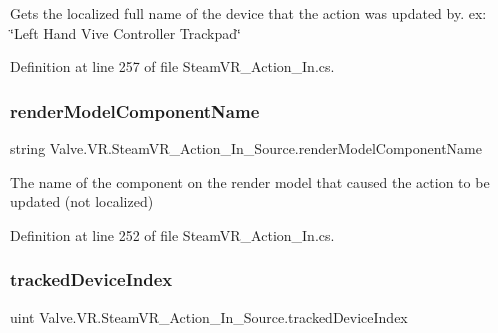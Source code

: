 Gets the localized full name of the device that the action was updated by. ex\+: \char`\"{}\+Left Hand Vive Controller Trackpad\char`\"{} 



Definition at line 257 of file Steam\+V\+R\+\_\+\+Action\+\_\+\+In.\+cs.

\mbox{\label{class_valve_1_1_v_r_1_1_steam_v_r___action___in___source_af15b7b53084c8385e25203b4d8ccc986}} 
\subsubsection{\texorpdfstring{renderModelComponentName}{renderModelComponentName}}
{\footnotesize\ttfamily string Valve.\+V\+R.\+Steam\+V\+R\+\_\+\+Action\+\_\+\+In\+\_\+\+Source.\+render\+Model\+Component\+Name\hspace{0.3cm}{\ttfamily [get]}}



The name of the component on the render model that caused the action to be updated (not localized) 



Definition at line 252 of file Steam\+V\+R\+\_\+\+Action\+\_\+\+In.\+cs.

\mbox{\label{class_valve_1_1_v_r_1_1_steam_v_r___action___in___source_ac20f6924626847c3957ad5b9092e5243}} 
\subsubsection{\texorpdfstring{trackedDeviceIndex}{trackedDeviceIndex}}
{\footnotesize\ttfamily uint Valve.\+V\+R.\+Steam\+V\+R\+\_\+\+Action\+\_\+\+In\+\_\+\+Source.\+tracked\+Device\+Index\hspace{0.3cm}{\ttfamily [get]}}




